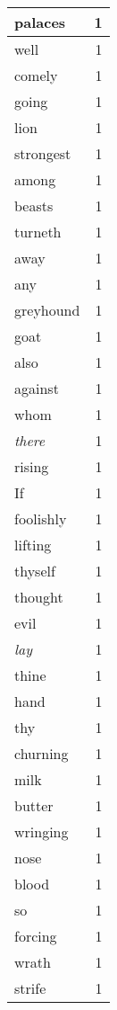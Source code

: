 \begin{center}
\begin{longtable}{l|r}
palaces & 1\\ \hline 
well & 1\\ \hline 
comely & 1\\ \hline 
going & 1\\ \hline 
lion & 1\\ \hline 
strongest & 1\\ \hline 
among & 1\\ \hline 
beasts & 1\\ \hline 
turneth & 1\\ \hline 
away & 1\\ \hline 
any & 1\\ \hline 
greyhound & 1\\ \hline 
goat & 1\\ \hline 
also & 1\\ \hline 
against & 1\\ \hline 
whom & 1\\ \hline 
\emph{there} & 1\\ \hline 
rising & 1\\ \hline 
If & 1\\ \hline 
foolishly & 1\\ \hline 
lifting & 1\\ \hline 
thyself & 1\\ \hline 
thought & 1\\ \hline 
evil & 1\\ \hline 
\emph{lay} & 1\\ \hline 
thine & 1\\ \hline 
hand & 1\\ \hline 
thy & 1\\ \hline 
churning & 1\\ \hline 
milk & 1\\ \hline 
butter & 1\\ \hline 
wringing & 1\\ \hline 
nose & 1\\ \hline 
blood & 1\\ \hline 
so & 1\\ \hline 
forcing & 1\\ \hline 
wrath & 1\\ \hline 
strife & 1\\ \hline 
\end{longtable}  
\end{center}  


  
\normalsize  

  
  


